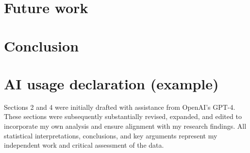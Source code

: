 \documentclass[12pt,a4paper]{article}
\theoremstyle{definition}
\begin{document}
\section{Future work}

\lipsum[13]

\section{Conclusion}

\lipsum[14]

\section{AI usage declaration (example)}

Sections 2 and 4 were initially drafted with assistance from OpenAI's GPT-4. These 
sections were subsequently substantially revised, expanded, and edited to 
incorporate my own analysis and ensure alignment with my research findings. All 
statistical interpretations, conclusions, and key arguments represent my 
independent work and critical assessment of the data.

\end{document}
